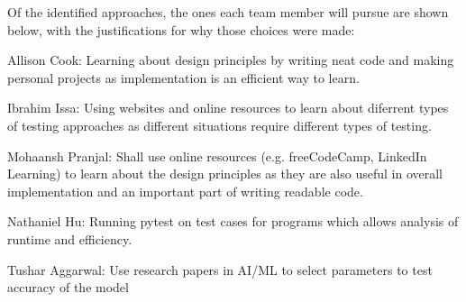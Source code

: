 \documentclass[12pt, titlepage]{article}
\begin{document}
Of the identified approaches, the ones each team member will pursue are shown below, with the justifications for why those choices were made:
\begin{enumerate}
    \begin{item}
        Allison Cook: Learning about design principles by writing neat code and making personal projects as implementation is an efficient way to learn.
    \end{item}
    \begin{item}
        Ibrahim Issa: Using websites and online resources to learn about diferrent types of testing approaches as different situations require different types of testing.
    \end{item}
    \begin{item}
        Mohaansh Pranjal: Shall use online resources (e.g. freeCodeCamp, LinkedIn Learning) to learn about the design principles as they are also useful in overall implementation and an important part of writing readable code.
    \end{item}
    \begin{item}
        Nathaniel Hu: Running pytest on test cases for programs which allows analysis of runtime and efficiency.
    \end{item}
    \begin{item}
        Tushar Aggarwal: Use research papers in AI/ML to select parameters to test accuracy of the model
    \end{item}
\end{enumerate}
\end{document}
